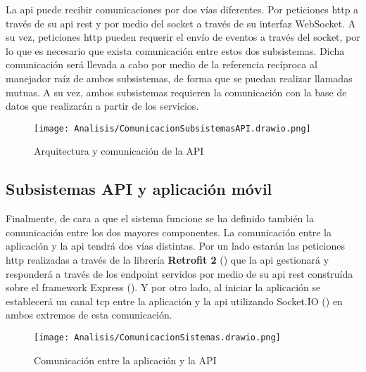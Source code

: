 La \acrshort{api} puede recibir comunicaciones por dos vías diferentes. Por peticiones \acrshort{http} a través de su \acrshort{api} \acrshort{rest} y por medio del socket a través de su interfaz WebSocket. A su vez, peticiones \acrshort{http} pueden requerir el envío de eventos a través del socket, por lo que es necesario que exista comunicación entre estos dos subsistemas. Dicha comunicación será llevada a cabo por medio de la referencia recíproca al manejador raíz de ambos subsistemas, de forma que se puedan realizar llamadas mutuas. A su vez, ambos subsistemas requieren la comunicación con la base de datos que realizarán a partir de los servicios.

\begin{figure}[H]
    \centering
    \texttt{[image: Analisis/ComunicacionSubsistemasAPI.drawio.png]}
    \caption{Arquitectura y comunicación de la API}
    \label{fig:sub-api}
\end{figure}

\subsection{Subsistemas API y aplicación móvil}

Finalmente, de cara a que el sistema funcione se ha definido también la comunicación entre los dos mayores componentes. La comunicación entre la aplicación y la \acrshort{api} tendrá dos vías distintas. Por un lado estarán las peticiones \acrshort{http} realizadas a través de la librería \textbf{Retrofit 2} () que la \acrshort{api} gestionará y responderá a través de los \gls{endpoint} servidos por medio de su \acrshort{api} \acrshort{rest} construída sobre el framework Express (). Y por otro lado, al iniciar la aplicación se establecerá un canal \acrshort{tcp} entre la aplicación y la \acrshort{api} utilizando Socket.IO () en ambos extremos de esta comunicación.

\begin{figure}[H]
    \centering
    \texttt{[image: Analisis/ComunicacionSistemas.drawio.png]}
    \caption{Comunicación entre la aplicación y la API}
    \label{fig:sub-comunicacion}
\end{figure}